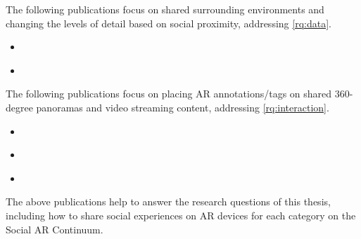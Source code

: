 The following publications focus on shared surrounding environments and changing the levels of detail based on social proximity, addressing \ref{rq:data}.

\begin{itemize}
    \item{ }
    \item{ }
\end{itemize}


The following publications focus on placing AR annotations/tags on shared 360-degree panoramas and video streaming content, addressing \ref{rq:interaction}.

\begin{itemize}
    \item{ }
    \item{ }
    \item{ }
\end{itemize}
The above publications help to answer the research questions of this thesis, including how to share social experiences on AR devices for each category on the Social AR Continuum. 
